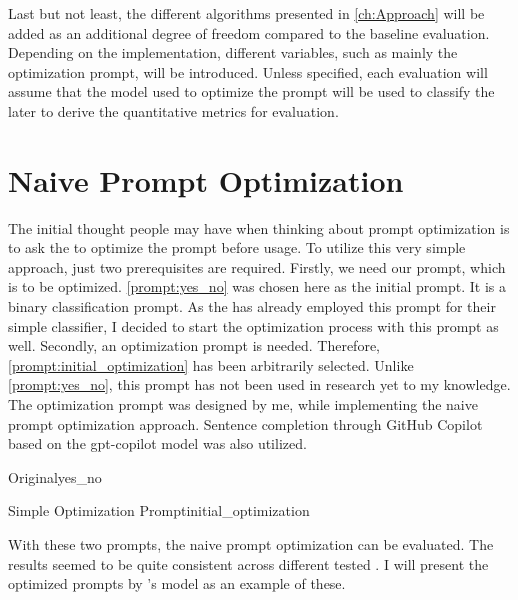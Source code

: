 Last but not least, the different \APE algorithms presented in \autoref{ch:Approach} will be added as an additional degree of freedom compared to the baseline evaluation.
Depending on the implementation, different variables, such as mainly the optimization prompt, will be introduced.
Unless specified, each evaluation will assume that the model used to optimize the prompt will be used to classify the \TLs later to derive the quantitative metrics for evaluation.


\section{Naive Prompt Optimization}
\label{sec:Evaluation:naive_optimization}

The initial thought people may have when thinking about prompt optimization is to ask the \LLM to optimize the prompt before usage.
To utilize this very simple approach, just two prerequisites are required.
Firstly, we need our prompt, which is to be optimized.
\autoref{prompt:yes_no} was chosen here as the initial prompt.
It is a \KISS binary classification prompt.
As the \LiSSAf has already employed this prompt for their simple classifier, I decided to start the optimization process with this prompt as well.
Secondly, an optimization prompt is needed.
Therefore, \autoref{prompt:initial_optimization} has been arbitrarily selected.
Unlike \autoref{prompt:yes_no}, this prompt has not been used in research yet to my knowledge.
The optimization prompt was designed by me, while implementing the naive prompt optimization approach.
Sentence completion through GitHub Copilot based on the \ac{gpt-copilot} model was also utilized.

\begin{prompt}{\KISS Original}{yes_no}
    \\
    
\end{prompt}

\begin{prompt}{Simple Optimization Prompt}{initial_optimization}
    \\
    
\end{prompt}

With these two prompts, the naive prompt optimization can be evaluated.
The results seemed to be quite consistent across different tested \LLMs.
I will present the optimized prompts by \OAI's \gpt model as an example of these.

